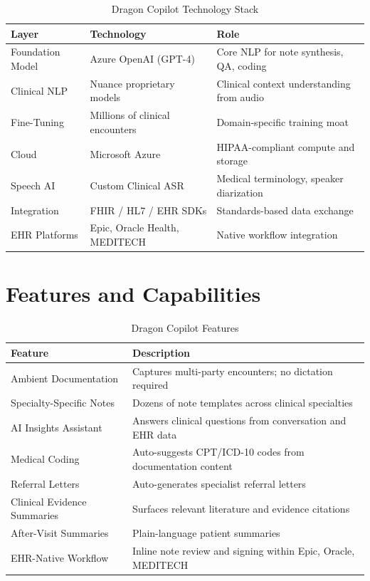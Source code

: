 \documentclass[12pt,a4paper]{article}
\begin{document}
\begin{table}[H]\centering\renewcommand{\arraystretch}{1.4}
\begin{tabularx}{\textwidth}{llX}\toprule
\textbf{Layer} & \textbf{Technology} & \textbf{Role}\\\midrule
Foundation Model & Azure OpenAI (GPT-4)       & Core NLP for note synthesis, QA, coding \\
Clinical NLP     & Nuance proprietary models  & Clinical context understanding from audio \\
Fine-Tuning      & Millions of clinical encounters & Domain-specific training moat \\
Cloud            & Microsoft Azure            & HIPAA-compliant compute and storage \\
Speech AI        & Custom Clinical ASR        & Medical terminology, speaker diarization \\
Integration      & FHIR / HL7 / EHR SDKs      & Standards-based data exchange \\
EHR Platforms    & Epic, Oracle Health, MEDITECH & Native workflow integration \\
\bottomrule\end{tabularx}\caption{Dragon Copilot Technology Stack}\end{table}

\section{Features and Capabilities}

\begin{table}[H]\centering\renewcommand{\arraystretch}{1.3}
\begin{tabularx}{\textwidth}{lX}\toprule
\textbf{Feature} & \textbf{Description}\\\midrule
Ambient Documentation      & Captures multi-party encounters; no dictation required \\
Specialty-Specific Notes   & Dozens of note templates across clinical specialties \\
AI Insights Assistant      & Answers clinical questions from conversation and EHR data \\
Medical Coding             & Auto-suggests CPT/ICD-10 codes from documentation content \\
Referral Letters           & Auto-generates specialist referral letters \\
Clinical Evidence Summaries & Surfaces relevant literature and evidence citations \\
After-Visit Summaries      & Plain-language patient summaries \\
EHR-Native Workflow        & Inline note review and signing within Epic, Oracle, MEDITECH \\
\bottomrule\end{tabularx}\caption{Dragon Copilot Features}\end{table}
\end{document}
